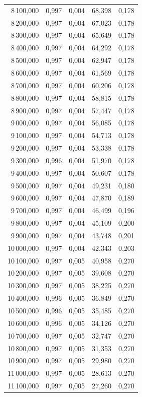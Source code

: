 \begin{longtable}{rrrrr}
8\,100,000 & 0,997 & 0,004 & 68,398 & 0,178\\
8\,200,000 & 0,997 & 0,004 & 67,023 & 0,178\\
8\,300,000 & 0,997 & 0,004 & 65,649 & 0,178\\
8\,400,000 & 0,997 & 0,004 & 64,292 & 0,178\\
8\,500,000 & 0,997 & 0,004 & 62,947 & 0,178\\
8\,600,000 & 0,997 & 0,004 & 61,569 & 0,178\\
8\,700,000 & 0,997 & 0,004 & 60,206 & 0,178\\
8\,800,000 & 0,997 & 0,004 & 58,815 & 0,178\\
8\,900,000 & 0,997 & 0,004 & 57,447 & 0,178\\
9\,000,000 & 0,997 & 0,004 & 56,085 & 0,178\\
9\,100,000 & 0,997 & 0,004 & 54,713 & 0,178\\
9\,200,000 & 0,997 & 0,004 & 53,338 & 0,178\\
9\,300,000 & 0,996 & 0,004 & 51,970 & 0,178\\
9\,400,000 & 0,997 & 0,004 & 50,607 & 0,178\\
9\,500,000 & 0,997 & 0,004 & 49,231 & 0,180\\
9\,600,000 & 0,997 & 0,004 & 47,870 & 0,189\\
9\,700,000 & 0,997 & 0,004 & 46,499 & 0,196\\
9\,800,000 & 0,997 & 0,004 & 45,109 & 0,200\\
9\,900,000 & 0,997 & 0,004 & 43,748 & 0,201\\
10\,000,000 & 0,997 & 0,004 & 42,343 & 0,203\\
10\,100,000 & 0,997 & 0,005 & 40,958 & 0,270\\
10\,200,000 & 0,997 & 0,005 & 39,608 & 0,270\\
10\,300,000 & 0,997 & 0,005 & 38,225 & 0,270\\
10\,400,000 & 0,996 & 0,005 & 36,849 & 0,270\\
10\,500,000 & 0,996 & 0,005 & 35,485 & 0,270\\
10\,600,000 & 0,996 & 0,005 & 34,126 & 0,270\\
10\,700,000 & 0,997 & 0,005 & 32,747 & 0,270\\
10\,800,000 & 0,997 & 0,005 & 31,353 & 0,270\\
10\,900,000 & 0,997 & 0,005 & 29,980 & 0,270\\
11\,000,000 & 0,997 & 0,005 & 28,613 & 0,270\\
11\,100,000 & 0,997 & 0,005 & 27,260 & 0,270\\

\end{longtable}
